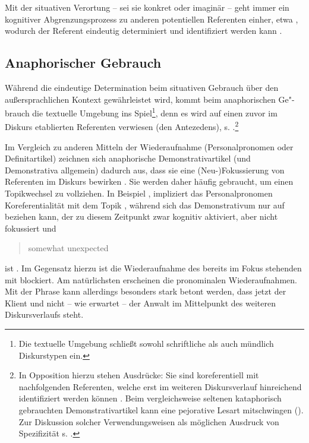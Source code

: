 Mit der situativen Verortung -- sei sie konkret oder imaginär -- geht immer ein kognitiver Abgrenzungsprozess zu anderen potentiellen Referenten einher, etwa   \parencite[vgl.][70]{Bisle-Muller1991}, wodurch der Referent eindeutig determiniert und identifiziert werden kann \parencite{Hoffmann2009}. 

 
\subsection{Anaphorischer Gebrauch}\label{sec:anaphorisch}

Während die eindeutige Determination beim situativen Gebrauch über den außersprachlichen Kontext gewährleistet wird, kommt beim anaphorischen Ge"-brauch die textuelle Umgebung ins Spiel\footnote{Die textuelle Umgebung schließt sowohl schriftliche als auch mündlich Diskurstypen ein.}, denn es wird auf einen zuvor im Diskurs etablierten Referenten verwiesen (den Antezedens), s.  \parencite[vgl.][229]{Himmelmann1996}.\footnote{In Opposition hierzu stehen  Ausdrücke: Sie sind koreferentiell mit nachfolgenden Referenten, welche erst im weiteren Diskursverlauf  hinreichend identifiziert werden können \parencite[s.][161f.]{Veldre-Gerner2007}. Beim vergleichsweise seltenen kataphorisch gebrauchten Demonstrativartikel kann eine pejorative Lesart mitschwingen (). Zur Diskussion solcher Verwendungsweisen als möglichen Ausdruck von Spezifizität s. \textcite[533]{deMulder2011}.}

\begin{exe}
	\ex \label{ex:anaph} 
\end{exe}

Im Vergleich zu anderen Mitteln der Wiederaufnahme (Personalpronomen oder Definitartikel) zeichnen sich anaphorische Demonstrativartikel (und Demonstrativa allgemein) dadurch aus, dass sie eine (Neu-)Fokussierung von Referenten im Diskurs bewirken \parencite [s. u.a.][]{Ehlich1979,Prince1981,Gundel1993,Comrie1997,Himmelmann1996,Diessel1999,Kibrik2011}. Sie werden daher häufig gebraucht, um einen Topikwechsel zu vollziehen. In Beispiel  \parencite[angelehnt an][96]{Diessel1999}, impliziert das Personalpronomen  Koreferentialität mit dem Topik , während sich das Demonstrativum  nur auf  beziehen kann, der zu diesem Zeitpunkt zwar kognitiv aktiviert, aber nicht fokussiert und \blockcquote[96]{Diessel1999}{somewhat unexpected} ist \parencite[vgl. hierzu][278f.]{Gundel1993}. Im Gegensatz hierzu ist die Wiederaufnahme des bereits im Fokus stehenden  mit  blockiert. Am natürlichsten erscheinen die pronominalen Wiederaufnahmen. Mit der Phrase  kann allerdings besonders stark betont werden, dass jetzt der Klient und nicht -- wie erwartet -- der Anwalt im Mittelpunkt des weiteren Diskursverlaufs steht.   

